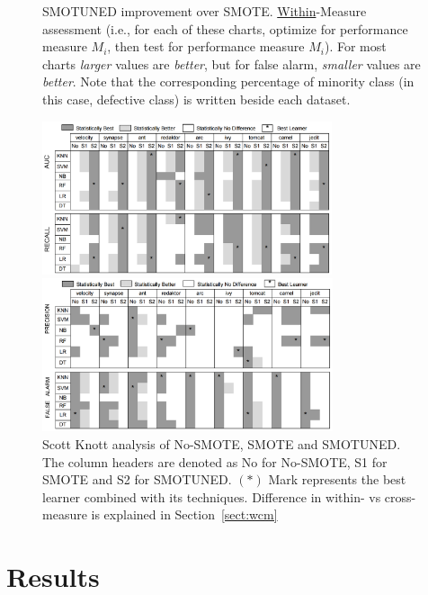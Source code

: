 \documentclass[sigconf,review, anonymous]{acmart}
\theoremstyle{break}
\theoremstyle{break}
\begin{document}
\begin{figure}[!t]
    \caption{SMOTUNED improvement over SMOTE. \underline{Within}-Measure
    assessment (i.e., for each of these charts,
    optimize for performance measure $M_i$, then test for
    performance measure $M_i$). For most charts
    {\em larger} values are {\em better}, but for false alarm,
    {\em smaller} values are {\em better}. Note that the corresponding percentage of minority class (in this case, defective class) is written beside each dataset.}
    \label{fig:tuned}
\end{figure}

\begin{figure}[!t]
\begin{minipage}{.49\linewidth}
\centering
        \includegraphics[width=0.9\linewidth,height=4.5cm ]{./fig/AUC_recall.png}
            \end{minipage}%
\begin{minipage}{.49\linewidth}
        \centering
        \includegraphics[width=0.9\linewidth,height=4.5cm]{./fig/prec_pf.png}
    \end{minipage}%
    \caption{Scott Knott analysis of No-SMOTE, SMOTE and SMOTUNED. The column headers are denoted as No for No-SMOTE, S1 for SMOTE and S2 for SMOTUNED. $(\ast)$ Mark represents the best learner combined with its techniques. Difference in within- vs cross-measure is explained in Section~\ref{sect:wcm}}
    \label{fig:stats}
\end{figure}

\section{Results}
\label{sect:results}
\end{document}
